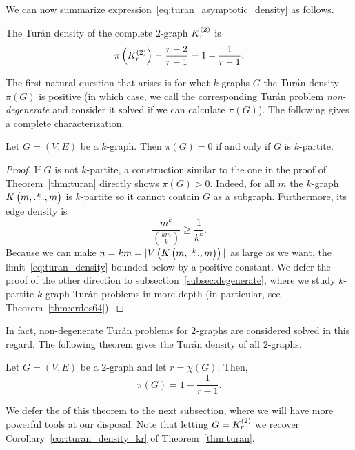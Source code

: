 We can now summarize expression~\eqref{eq:turan_asymptotic_density} as follows.
\begin{corollary} \label{cor:turan_density_kr}
    The Turán density of the complete $2$-graph $K^{(2)}_{r}$ is
    \[
        \pi\left(K^{(2)}_{r}\right) = \frac{r-2}{r-1} = 1 - \frac{1}{r-1}.
    \]
\end{corollary}

The first natural question that arises is for what $k$-graphs $G$ the Turán density $\pi(G)$ is positive
(in which case, we call the corresponding Turán problem \emph{non-degenerate}
and consider it solved if we can calculate $\pi(G)$).
The following gives a complete characterization.

\begin{proposition} \label{prop:degenerate}
    Let $G = (V, E)$ be a $k$-graph.
    Then $\pi(G) = 0$ if and only if $G$ is $k$-partite.
    \begin{proof}
        If $G$ is not $k$-partite, a construction similar to the one in the proof of Theorem~\ref{thm:turan}
        directly shows $\pi (G) > 0$.
        Indeed, for all $m$ the $k$-graph $K\left(m, \overset{k}{\dots}, m\right)$ is $k$-partite so it cannot contain $G$ as a subgraph.
        Furthermore, its edge density is
        \[
             \frac{m^k}{\binom{km}{k}} \geq \frac{1}{k^k}.
        \]
        Because we can make $n = km = |V\left( K\left(m, \overset{k}{\dots}, m\right) \right)|$ as large as we want,
        the limit~\eqref{eq:turan_density} bounded below by a positive constant.
        We defer the proof of the other direction to subsection~\ref{subsec:degenerate},
        where we study $k$-partite $k$-graph Turán problems
        in more depth (in particular, see Theorem~\ref{thm:erdos64}).
    \end{proof}
\end{proposition}

In fact, non-degenerate Turán problems for $2$-graphs are considered solved in this regard.
The following theorem gives the Turán density of all $2$-graphs.

\begin{theorem}
    \label{thm:erdos_stone_simonovits}
    Let $G = (V, E)$ be a $2$-graph and let $r = \chi(G)$.
    Then,
    \[
        \pi(G) = 1 - \frac{1}{r - 1}.
    \]
\end{theorem}

We defer the  of this theorem to the next subsection,
where we will have more powerful tools at our disposal.
Note that letting $G = K^{(2)}_{r}$ we recover
Corollary~\ref{cor:turan_density_kr} of Theorem~\ref{thm:turan}.

